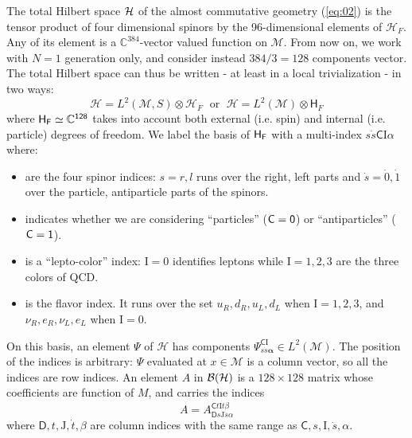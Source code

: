 \documentclass[11pt]{article}
\newcommand{\M}{\mathcal M}
\newcommand{\HH}{\mathcal H}
\newcommand{\spinind}[1]{\mathit{#1}}
\newcommand{\dotspinind}[1]{\mathit{\dot #1}}
\newcommand{\colorind}[1]{{\mathrm{#1}}}
\newcommand{\flavind}[1]{{\mathbf #1}}
\newcommand{\partind}[1]{{\sf #1}}
\newcommand{\sI}{\mathrm  I}
\newcommand{\sJ}{\mathrm J}
\newcommand{\sC}{\mathsf C}
\newcommand{\sD}{\mathsf D}
\begin{document}
The total Hilbert space ${\cal H}$ of the almost commutative geometry (\ref{eq:02}) is the tensor product of four
dimensional spinors by the 96-dimensional elements of $\mathcal
H_F$. Any of its element is a $\mathbb C^{384}$-vector valued
function on $\M$. From now on, we work with $N=1$ generation only, and
consider instead $384/3 = 128$ components vector. The total Hilbert space
can thus be written - at least in a local trivialization - in two ways:
\begin{equation}
\HH  = L^2(\M, S)\otimes \mathcal H_F \; \text{ or }\; \HH = L^2(\M)\otimes \mathsf H_F
\label{eq:10}
\end{equation}
where $\sf H_F\simeq \mathbb C^{128}$ takes  into account both external (i.e. spin) and internal (i.e. particle) degrees of
freedom. We label
 the basis of $\sf H_F$ with  a multi-index $s\dot s\sC\sI\alpha$
 where:
\begin{itemize}
\item[$\spinind s ,\dotspinind s$]  are
  the  four spinor indices: $\spinind{s=r,l}$ runs over the right, left
  parts  and $\dotspinind{s=\dot 0, \dot 1}$ over
  the particle, antiparticle parts of the spinors. 

\item[$\partind {C}$] indicates whether we are considering
  ``particles'' ($\partind{C=0}$) or ``antiparticles''  ($\partind{
    C=1}$).

\item[$\sI$] is a ``lepto-color'' index: $\sI = 0$ identifies leptons while $\colorind
  I=1,2,3$ are the three colors of QCD.

\item[$\flavind \alpha$] is the flavor index. It runs over the set $u_R,d_R,u_L,d_L$ when $\colorind{I=1,2,3}$, and $\nu_R,e_R,\nu_L,e_L$ when $\colorind{I=0}$. 
\end{itemize}
On this basis, an element $\Psi$ of $\HH$ has components
$\Psi^{\mathsf C \colorind I}_{\spinind s  \dotspinind s
  \flavind{\alpha}}\in L^2(\M)$. The position of the indices is arbitrary: $\Psi$ evaluated
at $x\in\M$ is a column vector, so all the
indices are row indices. An element $A$ in ${\cal B}(\cal H)$ is a
$128\times 128$ matrix whose coefficients are function of $M$, and
carries the indices
\begin{equation}
  \label{eq:97}
  A = A_{\sD s \sJ \dot s \alpha}^{\sC t \sI \dot t \beta}
\end{equation}
where $\sD, t, \sJ, \dot t, \beta$ are column indices with the same
range as $\sC, s, \sI, \dot s, \alpha$.
\end{document}
